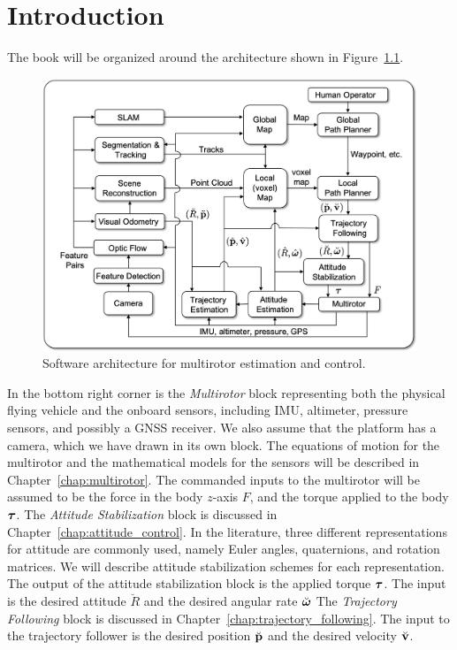 \chapter{Introduction}
\label{chap:introduction}


The book will be organized around the architecture shown in Figure~\ref{fig:intro_architecture}.

\begin{figure}[h]
   \centering
   \includegraphics[width=\linewidth]{chap1_intro/figures/architecture} 
   \caption{Software architecture for multirotor estimation and control.}
   \label{fig:intro_architecture}
\end{figure}

In the bottom right corner is the {\em Multirotor} block representing both the physical flying vehicle and the onboard sensors, including IMU, altimeter, pressure sensors, and possibly a GNSS receiver.  We also assume that the platform has a camera, which we have drawn in its own block.  The equations of motion for the multirotor and the mathematical models for the sensors will be described in Chapter~\ref{chap:multirotor}.  The commanded inputs to the multirotor will be assumed to be the force in the body $z$-axis $F$, and the torque applied to the body $\boldsymbol{\tau}$.  
%
The {\em Attitude Stabilization} block is discussed in Chapter~\ref{chap:attitude_control}.  In the literature, three different representations for attitude are commonly used, namely Euler angles, quaternions, and rotation matrices.  We will describe attitude stabilization schemes for each representation.  The output of the attitude stabilization block is the applied torque $\boldsymbol{\tau}$.  The input is the desired attitude $\breve{R}$ and the desired angular rate $\breve{\boldsymbol{\omega}}$
%
The {\em Trajectory Following} block is discussed in Chapter~\ref{chap:trajectory_following}.  The input to the trajectory follower is the desired position $\breve{\mathbf{p}}$ and the desired velocity $\breve{\mathbf{v}}$.  


